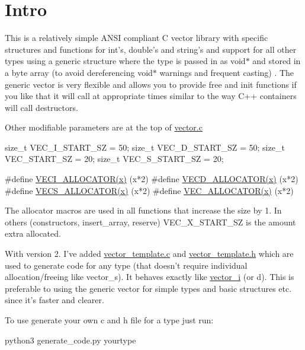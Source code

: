 \hypertarget{index_Intro}{}\section{\-Intro}\label{index_Intro}
\-This is a relatively simple \-A\-N\-S\-I compliant \-C vector library with specific structures and functions for int's, double's and string's and support for all other types using a generic structure where the type is passed in as void$\ast$ and stored in a byte array (to avoid dereferencing void$\ast$ warnings and frequent casting) . \-The generic vector is very flexible and allows you to provide free and init functions if you like that it will call at appropriate times similar to the way \-C++ containers will call destructors.

\-Other modifiable parameters are at the top of \hyperlink{vector_8c}{vector.\-c} 
\begin{DoxyPre}
size\_t VEC\_I\_START\_SZ = 50;
size\_t VEC\_D\_START\_SZ = 50;
size\_t VEC\_START\_SZ = 20;
size\_t VEC\_S\_START\_SZ = 20;\end{DoxyPre}



\begin{DoxyPre}#define \hyperlink{vectori_8c_a88db9d722845b6a23eb29d044a0a3c98}{VECI\_ALLOCATOR(x)} (x*2)
#define \hyperlink{vectord_8c_af2c425102d9020ae35b894de0c7eadea}{VECD\_ALLOCATOR(x)} (x*2)
#define \hyperlink{vectorstr_8c_ac87bafa72aa9c4a4b255163bede52add}{VECS\_ALLOCATOR(x)} (x*2)
#define \hyperlink{vector_8c_acc6ff7ec59b6544f657758f724fb7a8b}{VEC\_ALLOCATOR(x)} (x*2)
\end{DoxyPre}
 \-The allocator macros are used in all functions that increase the size by 1. \-In others (constructors, insert\-\_\-array, reserve) \-V\-E\-C\-\_\-\-X\-\_\-\-S\-T\-A\-R\-T\-\_\-\-S\-Z is the amount extra allocated.

\-With version 2. \-I've added \hyperlink{vector__template_8c}{vector\-\_\-template.\-c} and \hyperlink{vector__template_8h}{vector\-\_\-template.\-h} which are used to generate code for any type (that doesn't require individual allocation/freeing like vector\-\_\-s). \-It behaves exactly like \hyperlink{structvector__i}{vector\-\_\-i} (or d). \-This is preferable to using the generic vector for simple types and basic structures etc. since it's faster and clearer.

\-To use generate your own c and h file for a type just run\-: 
\begin{DoxyPre}
python3 generate\_code.py yourtype
\end{DoxyPre}


